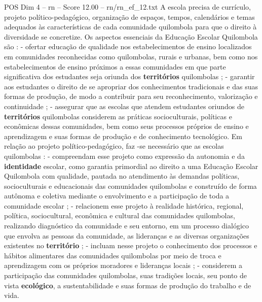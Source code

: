 \begin{textsample}{POS Dim 4 – rn – Score 12.00 – rn/rn\_ef\_12.txt}
A escola precisa de currículo, projeto político-pedagógico, organização de espaços, tempos, calendários e temas adequados às características de cada comunidade quilombola para que o direito à diversidade se concretize.
Os aspectos essenciais da Educação Escolar Quilombola são : - ofertar educação de qualidade nos estabelecimentos de ensino localizados em comunidades reconhecidas como quilombolas, rurais e urbanas, bem como nos estabelecimentos de ensino próximos a essas comunidades em que parte significativa dos estudantes seja oriunda dos \textbf{territórios} quilombolas ; - garantir aos estudantes o direito de se apropriar dos conhecimentos tradicionais e das suas formas de produção, de modo a contribuir para seu reconhecimento, valorização e continuidade ; - assegurar que as escolas que atendem estudantes oriundos de \textbf{territórios} quilombolas considerem as práticas socioculturais, políticas e econômicas dessas comunidades, bem como seus processos próprios de ensino e aprendizagem e suas formas de produção e de conhecimento tecnológico.
Em relação ao projeto político-pedagógico, faz -se necessário que as escolas quilombolas : - compreendam esse projeto como expressão da autonomia e da \textbf{identidade} escolar, como garantia primordial ao direito a uma Educação Escolar Quilombola com qualidade, pautada no atendimento às demandas políticas, socioculturais e educacionais das comunidades quilombolas e construído de forma autônoma e coletiva mediante o envolvimento e a participação de toda a comunidade escolar ; - relacionem esse projeto à realidade histórica, regional, política, sociocultural, econômica e cultural das comunidades quilombolas, realizando diagnóstico da comunidade e seu entorno, em um processo dialógico que envolva as pessoas da comunidade, as lideranças e as diversas organizações existentes no \textbf{território} ; - incluam nesse projeto o conhecimento dos processos e hábitos alimentares das comunidades quilombolas por meio de troca e aprendizagem com os próprios moradores e lideranças locais ; - considerem a participação das comunidades quilombolas, suas tradições locais, seu ponto de vista \textbf{ecológico}, a sustentabilidade e suas formas de produção do trabalho e de vida.

\end{textsample}

